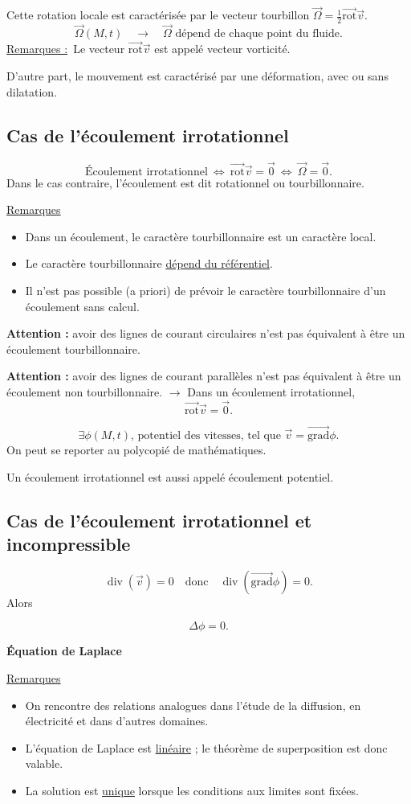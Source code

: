 \documentclass[11pt,a4paper]{article}
\newcommand{\vv}{\vec v}
\newcommand{\OO}{\vec\Omega}
\newcommand{\grad}{\overrightarrow{\mathrm{grad}}}
\newcommand{\rot}{\overrightarrow{\mathrm{rot}}}
\newcommand{\ddiv}{\operatorname{div}}
\newcommand{\rem}{\underline{Remarques :}\ }
\begin{document}
Cette rotation locale est caractérisée par le vecteur tourbillon $\OO=\frac12\rot\vv$.
\[\OO(M,t)\quad\longrightarrow\quad\OO\text{ dépend de chaque point du fluide}.\]
\rem Le vecteur $\rot\vv$ est appelé vecteur vorticité.

D'autre part, le mouvement est caractérisé par une déformation, avec ou sans dilatation.
\subsection{Cas de l'écoulement irrotationnel}
\[\text{Écoulement irrotationnel}\ \Longleftrightarrow\ \rot\vv=\vec0\ \Longleftrightarrow\ \OO=\vec0.\]
Dans le cas contraire, l’écoulement est dit rotationnel ou tourbillonnaire.

\underline{Remarques}
\begin{itemize}
\item Dans un écoulement, le caractère tourbillonnaire est un caractère local.
\item Le caractère tourbillonnaire \underline{dépend du référentiel}.
\item Il n'est pas possible (a priori) de prévoir le caractère tourbillonnaire d'un écoulement sans calcul.
\end{itemize}
\textbf{Attention :} avoir des lignes de courant circulaires n’est pas équivalent à être un écoulement tourbillonnaire.

\textbf{Attention :} avoir des lignes de courant parallèles n’est pas équivalent à être un écoulement non tourbillonnaire.
\newpage
\(\rightarrow\) Dans un écoulement irrotationnel,
\[\rot\vv=\vec0.\]
\begin{cadre}[etoiles={***}]
\[\exists\phi(M,t)\text{, potentiel des vitesses, tel que }\vv=\grad\phi.\]
On peut se reporter au polycopié de mathématiques.
\end{cadre}
Un écoulement irrotationnel est aussi appelé écoulement potentiel.
\subsection{Cas de l'écoulement irrotationnel et incompressible}
\[\ddiv(\vv)=0\quad\text{donc}\quad\ddiv(\grad\phi)=0.\]
Alors
\begin{cadre}[etoiles={*****}]\[\Delta\phi=0.\]\begin{center}\textbf{Équation de Laplace}\end{center}\end{cadre}
\underline{Remarques}
\begin{itemize}
\item On rencontre des relations analogues dans l’étude de la diffusion, en électricité et dans d’autres domaines.
\item L'équation de Laplace est \underline{linéaire} ; le théorème de superposition est donc valable.
\item La solution est \underline{unique} lorsque les conditions aux limites sont fixées.
\end{itemize}
\end{document}
